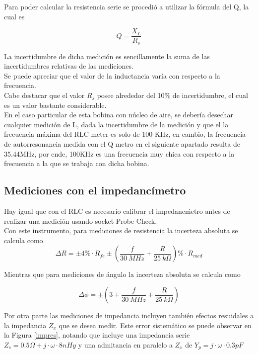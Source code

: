 \documentclass[a4paper,10pt]{article}
\begin{document}
		\indent Para poder calcular la resistencia serie se procedió a utilizar 
		la fórmula del Q, la cual es 

		$$Q = \frac{X_L}{R_s}$$

		\indent La incertidumbre de dicha medición es sencillamente la suma de 
		las incertidumbres relativas de las mediciones. \\
		\indent Se puede apreciar que el valor de la inductancia varía con 
		respecto a la frecuencia. \\
		\indent Cabe destacar que el valor $R_s$ posee alrededor del 10\% de 
		incertidumbre, el cual es un valor bastante considerable. \\
		\indent En el caso particular de esta bobina con núcleo de aire, se 
		debería desechar cualquier medición de L, dada la incertidumbre de la 
		medición y que el la frecuencia máxima del RLC meter es solo de 100 KHz,
		en cambio, la frecuencia de autorresonancia medida con el Q metro en el 
		siguiente apartado resulta de 35.44MHz, por ende, 100KHz es una 
		frecuencia muy chica con respecto a la frecuencia a la que se trabaja 
		con dicha bobina.

	\subsection{Mediciones con el impedanc\'imetro}
		
		\indent Hay igual que con el RLC es necesario calibrar el 
		impedanc\'metro antes de realizar una medici\'on usando socket Probe 
		Check. \\
		\indent Con este instrumento, para mediciones de resistencia la 
		incerteza absoluta se calcula como
		\begin{equation}\label{modulo}
			\Delta R=\pm 4\%\cdot R_{fe}\pm(\frac{f}{30~MHz}+\frac{R}{25~k
			\Omega})\%\cdot R_{med}
		\end{equation}
		
		\indent Mientras que para mediciones de \'angulo la incerteza absoluta 
		se calcula como
		
		\begin{equation}\label{angulo} 
			\Delta\phi=\pm(3+\frac{f}{30~MHz}+\frac{R}{25~k\Omega})
		\end{equation}
		
		\indent Por otra parte las mediciones de impedancia incluyen tambi\'en 
		efectos resuidales a la impedancia $Z_x$ que se desea medir. Este error 
		sistem\'atico se puede observar en la Figura \ref{impres}, notando que 
		incluye una impedancia serie $Z_s=0.5\Omega+j\cdot\omega\cdot8nHy$ y una
		admitancia en paralelo a $Z_x$ de $Y_p=j\cdot\omega\cdot0.3pF$
		
\end{document}
